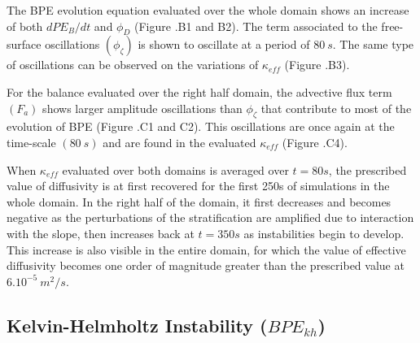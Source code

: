 The BPE evolution equation evaluated over the whole domain shows an increase of both $dPE_B/dt$ and $\phi_D$ (Figure .B1 and B2). The term associated to the free-surface oscillations $(\phi_{\zeta})$ is shown to oscillate at a period of $80\ s$.%
The same type of oscillations can be observed on the variations of $\kappa_{eff}$ (Figure .B3). 

For the balance evaluated over the right half domain, the advective flux term $(F_a)$ shows larger amplitude oscillations than $\phi_{\zeta}$ that contribute to most of the evolution of BPE (Figure .C1 and C2). This oscillations are once again at the time-scale $(80\ s)$ and are found in the evaluated $\kappa_{eff}$ (Figure .C4).

When $\kappa_{eff}$ evaluated over both domains is averaged over $t=80s$, the prescribed value of diffusivity is at first recovered for the first 250s of simulations in the whole domain. In the right half of the domain, it first decreases and becomes negative as the perturbations of the stratification are amplified due to interaction with the slope, then increases back at $t=350s$ as instabilities begin to develop. This increase is also visible in the entire domain, for which the value of effective diffusivity becomes one order of magnitude greater than the prescribed value at $6.10^{-5} \ m^2/s$. 

\subsection{Kelvin-Helmholtz Instability ($BPE_{kh}$)}
\label{section_BPE_KH}

